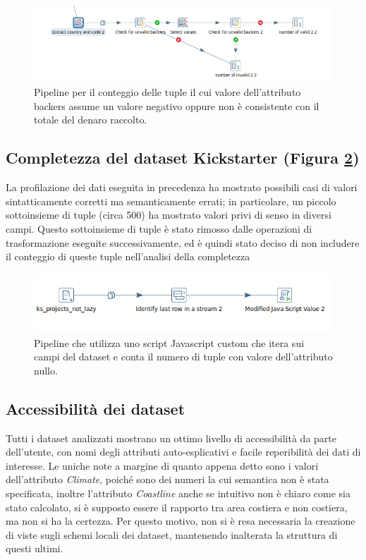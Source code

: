 \begin{figure}[h!]
	\centering
	\includegraphics[width=0.7\linewidth]{images/DQ_backersconsistency}
	\caption{Pipeline per il conteggio delle tuple il cui valore dell'attributo backers assume un valore negativo oppure non è consistente con il totale del denaro raccolto.}
	\label{fig:dqbackersconsistency}
\end{figure}


\subsection{Completezza del dataset Kickstarter (Figura \ref{fig:dqcompletezza})}
La profilazione dei dati eseguita in precedenza ha mostrato possibili casi di valori sintatticamente corretti ma semanticamente errati; in particolare, un piccolo sottoinsieme di tuple (circa 500) ha mostrato valori privi di senso in diversi campi. Questo sottoinsieme di tuple è stato rimosso dalle operazioni di trasformazione eseguite successivamente, ed è quindi stato deciso di non includere il conteggio di queste tuple nell'analisi della completezza

\begin{figure}[h!]
	\centering
	\includegraphics[width=0.7\linewidth]{images/DQ_completezza}
	\caption{Pipeline che utilizza uno script Javascript custom che itera sui campi del dataset e conta il numero di tuple con valore dell'attributo nullo.}
	\label{fig:dqcompletezza}
\end{figure}


\subsection{Accessibilità dei dataset}
Tutti i dataset analizzati mostrano un ottimo livello di accessibilità da parte dell'utente, con nomi degli attributi auto-esplicativi e facile reperibilità dei dati di interesse. 
Le uniche note a margine di quanto appena detto sono i valori dell'attributo \textit{Climate}, poiché sono dei numeri la cui semantica non è stata specificata, inoltre l'attributo \textit{Coastline} anche se intuitivo non è chiaro come sia stato calcolato, si è supposto essere il rapporto tra area costiera e non costiera, ma non si ha la certezza.
Per questo motivo, non si è resa necessaria la creazione di viste sugli schemi locali dei dataset, mantenendo inalterata la struttura di questi ultimi.

